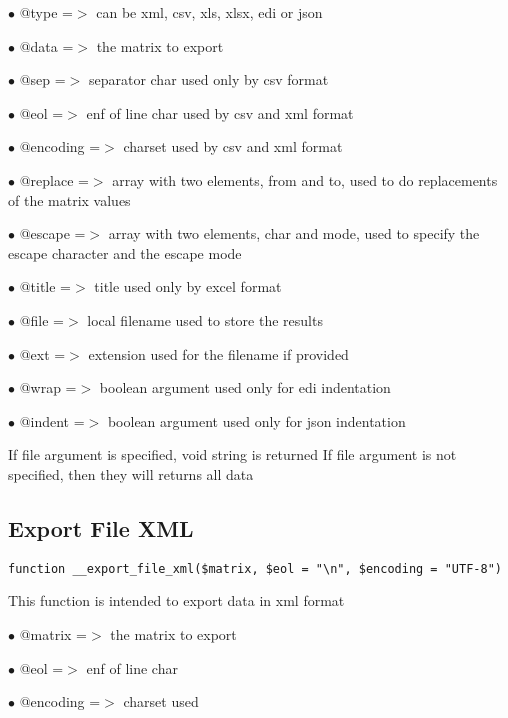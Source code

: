 \documentclass[a4paper]{book}
\begin{document}
\begin{compactitem}
\item[\color{myblue}$\bullet$] @type     =$>$ can be xml, csv, xls, xlsx, edi or json
\item[\color{myblue}$\bullet$] @data     =$>$ the matrix to export
\item[\color{myblue}$\bullet$] @sep      =$>$ separator char used only by csv format
\item[\color{myblue}$\bullet$] @eol      =$>$ enf of line char used by csv and xml format
\item[\color{myblue}$\bullet$] @encoding =$>$ charset used by csv and xml format
\item[\color{myblue}$\bullet$] @replace  =$>$ array with two elements, from and to, used to do replacements of the matrix values
\item[\color{myblue}$\bullet$] @escape   =$>$ array with two elements, char and mode, used to specify the escape character and the
             escape mode
\item[\color{myblue}$\bullet$] @title    =$>$ title used only by excel format
\item[\color{myblue}$\bullet$] @file     =$>$ local filename used to store the results
\item[\color{myblue}$\bullet$] @ext      =$>$ extension used for the filename if provided
\item[\color{myblue}$\bullet$] @wrap     =$>$ boolean argument used only for edi indentation
\item[\color{myblue}$\bullet$] @indent   =$>$ boolean argument used only for json indentation
\end{compactitem}

If file argument is specified, void string is returned
If file argument is not specified, then they will returns all data

\hypertarget{toc123}{}
\subsection{Export File XML}

\begin{lstlisting}
function __export_file_xml($matrix, $eol = "\n", $encoding = "UTF-8")
\end{lstlisting}

This function is intended to export data in xml format

\begin{compactitem}
\item[\color{myblue}$\bullet$] @matrix   =$>$ the matrix to export
\item[\color{myblue}$\bullet$] @eol      =$>$ enf of line char
\item[\color{myblue}$\bullet$] @encoding =$>$ charset used
\end{compactitem}
\end{document}
